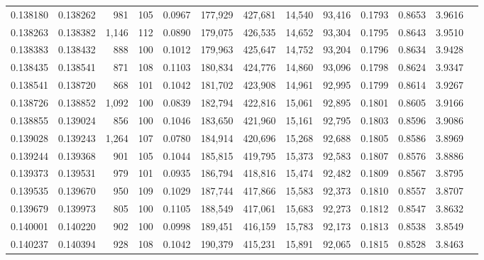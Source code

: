 \begin{tabular}{rrrrrrrrrrrrr}
0.138180 & 0.138262 &   981 & 105 &                                     0.0967 & 177,929 & 427,681 &  14,540 &  93,416 & 0.1793 & 0.8653 & 3.9616 \\
0.138263 & 0.138382 & 1,146 & 112 &                                     0.0890 & 179,075 & 426,535 &  14,652 &  93,304 & 0.1795 & 0.8643 & 3.9510 \\
0.138383 & 0.138432 &   888 & 100 &                                     0.1012 & 179,963 & 425,647 &  14,752 &  93,204 & 0.1796 & 0.8634 & 3.9428 \\
0.138435 & 0.138541 &   871 & 108 &                                     0.1103 & 180,834 & 424,776 &  14,860 &  93,096 & 0.1798 & 0.8624 & 3.9347 \\
0.138541 & 0.138720 &   868 & 101 &                                     0.1042 & 181,702 & 423,908 &  14,961 &  92,995 & 0.1799 & 0.8614 & 3.9267 \\
0.138726 & 0.138852 & 1,092 & 100 &                                     0.0839 & 182,794 & 422,816 &  15,061 &  92,895 & 0.1801 & 0.8605 & 3.9166 \\
0.138855 & 0.139024 &   856 & 100 &                                     0.1046 & 183,650 & 421,960 &  15,161 &  92,795 & 0.1803 & 0.8596 & 3.9086 \\
0.139028 & 0.139243 & 1,264 & 107 &                                     0.0780 & 184,914 & 420,696 &  15,268 &  92,688 & 0.1805 & 0.8586 & 3.8969 \\
0.139244 & 0.139368 &   901 & 105 &                                     0.1044 & 185,815 & 419,795 &  15,373 &  92,583 & 0.1807 & 0.8576 & 3.8886 \\
0.139373 & 0.139531 &   979 & 101 &                                     0.0935 & 186,794 & 418,816 &  15,474 &  92,482 & 0.1809 & 0.8567 & 3.8795 \\
0.139535 & 0.139670 &   950 & 109 &                                     0.1029 & 187,744 & 417,866 &  15,583 &  92,373 & 0.1810 & 0.8557 & 3.8707 \\
0.139679 & 0.139973 &   805 & 100 &                                     0.1105 & 188,549 & 417,061 &  15,683 &  92,273 & 0.1812 & 0.8547 & 3.8632 \\
0.140001 & 0.140220 &   902 & 100 &                                     0.0998 & 189,451 & 416,159 &  15,783 &  92,173 & 0.1813 & 0.8538 & 3.8549 \\
0.140237 & 0.140394 &   928 & 108 &                                     0.1042 & 190,379 & 415,231 &  15,891 &  92,065 & 0.1815 & 0.8528 & 3.8463 \\

\end{tabular}
